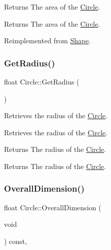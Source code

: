 \begin{DoxyReturn}{Returns}
The area of the \mbox{\hyperlink{class_circle}{Circle}}.
\end{DoxyReturn}


\begin{DoxyReturn}{Returns}
The area of the \mbox{\hyperlink{class_circle}{Circle}}. 
\end{DoxyReturn}


Reimplemented from \mbox{\hyperlink{class_shape_ad0c742cb695fdb3e575a31bcd4784c26}{Shape}}.

\mbox{\label{class_circle_a90014f73c1c55bfdbaab39971f774944}} 
\subsubsection{\texorpdfstring{GetRadius()}{GetRadius()}}
{\footnotesize\ttfamily float Circle\+::\+Get\+Radius (\begin{DoxyParamCaption}{ }\end{DoxyParamCaption})}



Retrieves the radius of the \mbox{\hyperlink{class_circle}{Circle}}. 

Retrieves the radius of the \mbox{\hyperlink{class_circle}{Circle}}.

\begin{DoxyReturn}{Returns}
The radius of the \mbox{\hyperlink{class_circle}{Circle}}.
\end{DoxyReturn}


\begin{DoxyReturn}{Returns}
The radius of the \mbox{\hyperlink{class_circle}{Circle}}. 
\end{DoxyReturn}
\mbox{\label{class_circle_a078579746ec5d8443219f0fa2ce6373e}} 
\subsubsection{\texorpdfstring{OverallDimension()}{OverallDimension()}}
{\footnotesize\ttfamily float Circle\+::\+Overall\+Dimension (\begin{DoxyParamCaption}\item[{void}]{ }\end{DoxyParamCaption}) const\hspace{0.3cm}{\ttfamily [override]}, {\ttfamily [virtual]}}



